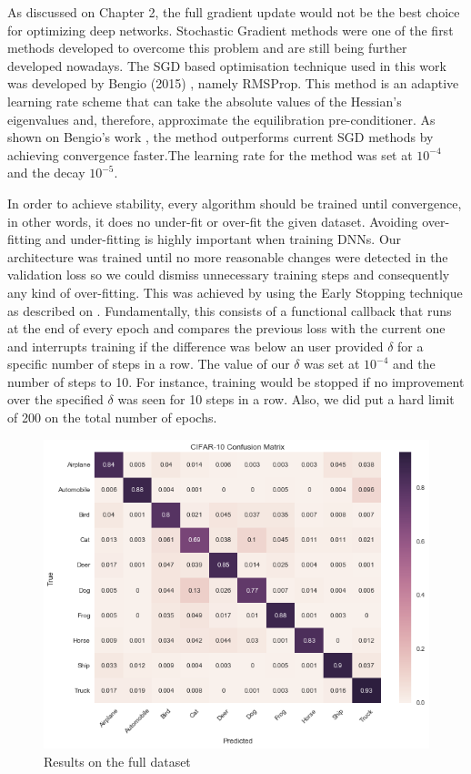 As discussed on Chapter 2, the full gradient update would not be the best choice for optimizing deep networks. Stochastic Gradient methods were one of the first methods developed to overcome this problem and are still being further developed nowadays. The SGD based optimisation technique used in this work was developed by Bengio (2015) \cite{bengiormsprop}, namely RMSProp. This method is an adaptive learning rate scheme that can take the absolute values of the Hessian's eigenvalues and, therefore, approximate the equilibration pre-conditioner. As shown on Bengio's work \cite{bengiormsprop}, the method outperforms current SGD methods by achieving convergence faster.The learning rate for the method was set at $10^{-4}$ and the decay $10^{-5}$.

In order to achieve stability, every algorithm should be trained until convergence, in other words, it does no under-fit or over-fit the given dataset. Avoiding over-fitting and under-fitting is highly important when training DNNs. Our architecture was trained until no more reasonable changes were detected in the validation loss so we could dismiss unnecessary training steps and consequently any kind of over-fitting. This was achieved by using the Early Stopping technique as described on \cite{stanford2016}. Fundamentally, this consists of a functional callback that runs at the end of every epoch and compares the previous loss with the current one and interrupts training if the difference was below an user provided $\delta$ for a specific number of steps in a row. The value of our $\delta$ was set at $10^{-4}$ and the number of steps to 10. For instance, training would be stopped if no improvement over the specified $\delta$ was seen for 10 steps in a row. Also, we did put a hard limit of 200 on the total number of epochs.

\begin{figure}[!h]
	\centering
	\includegraphics[scale=0.6]{conf_matrix.png}
	\caption{Results on the full dataset}
	\label{fig:conf_matrix_full}
\end{figure}

